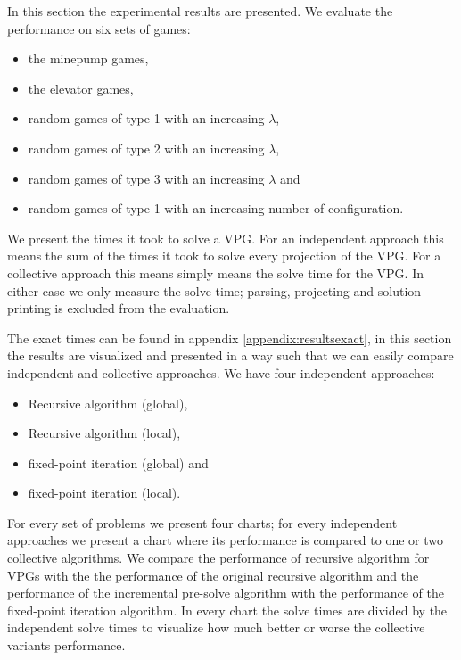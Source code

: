 In this section the experimental results are presented. We evaluate the performance on six sets of games:
\begin{itemize}
	\item the minepump games,
	\item the elevator games,
	\item random games of type 1 with an increasing $\lambda$,
	\item random games of type 2 with an increasing $\lambda$,
	\item random games of type 3 with an increasing $\lambda$ and
	\item random games of type 1 with an increasing number of configuration.
\end{itemize}

We present the times it took to solve a VPG. For an independent approach this means the sum of the times it took to solve every projection of the VPG. For a collective approach this means simply means the solve time for the VPG. In either case we only measure the solve time; parsing, projecting and solution printing is excluded from the evaluation.

The exact times can be found in appendix \ref{appendix:resultsexact}, in this section the results are visualized and presented in a way such that we can easily compare independent and collective approaches. We have four independent approaches:
\begin{itemize}
	\item Recursive algorithm (global),
	\item Recursive algorithm (local),
	\item fixed-point iteration (global) and
	\item fixed-point iteration (local).
\end{itemize}
For every set of problems we present four charts; for every independent approaches we present a chart where its performance is compared to one or two collective algorithms. We compare the performance of recursive algorithm for VPGs with the the performance of the original recursive algorithm and the performance of the incremental pre-solve algorithm with the performance of the fixed-point iteration algorithm. In every chart the solve times are divided by the independent solve times to visualize how much better or worse the collective variants performance.

